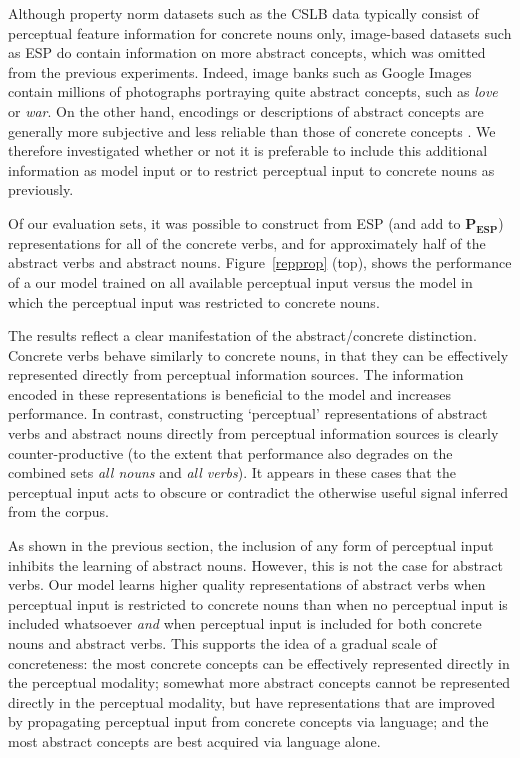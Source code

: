 Although property norm datasets such as the CSLB data typically consist of perceptual feature information for concrete nouns only, image-based datasets such as ESP do contain information on more abstract concepts, which was omitted from the previous experiments. Indeed, image banks such as Google Images contain millions of photographs portraying quite abstract concepts, such as \emph{love} or \emph{war}. On the other hand, encodings or descriptions of abstract concepts are generally more subjective and less reliable than those of concrete concepts \cite{katja2005content}. We therefore investigated whether or not it is preferable to include this additional information as model input or to restrict perceptual input to concrete nouns as previously.    

Of our evaluation sets, it was possible to construct from ESP (and add to \(\mathbf{P_{ESP}}\)) representations for all of the concrete verbs, and for approximately half of the abstract verbs and abstract nouns. Figure~\ref{repprop} (top), shows the performance of a our model trained on all available perceptual input versus the model in which the perceptual input was restricted to concrete nouns. 

The results reflect a clear manifestation of the abstract/concrete distinction. Concrete verbs behave similarly to concrete nouns, in that they can be effectively represented directly from perceptual information sources. The information encoded in these representations is beneficial to the model and increases performance. In contrast, constructing `perceptual' representations of abstract verbs and abstract nouns directly from perceptual information sources is clearly counter-productive (to the extent that performance also degrades on the combined sets \emph{all nouns} and \emph{all verbs}). It appears in these cases that the perceptual input acts to obscure or contradict the otherwise useful signal inferred from the corpus.

As shown in the previous section, the inclusion of any form of perceptual input inhibits the learning of abstract nouns. However, this is not the case for abstract verbs. Our model learns higher quality representations of abstract verbs when perceptual input is restricted to concrete nouns than when no perceptual input is included whatsoever \emph{and} when perceptual input is included for both concrete nouns and abstract verbs. This supports the idea of a gradual scale of concreteness: the most concrete concepts can be effectively represented directly in the perceptual modality; somewhat more abstract concepts cannot be represented directly in the perceptual modality, but have representations that are improved by propagating perceptual input from concrete concepts via language; and the most abstract concepts are best acquired via language alone.   

